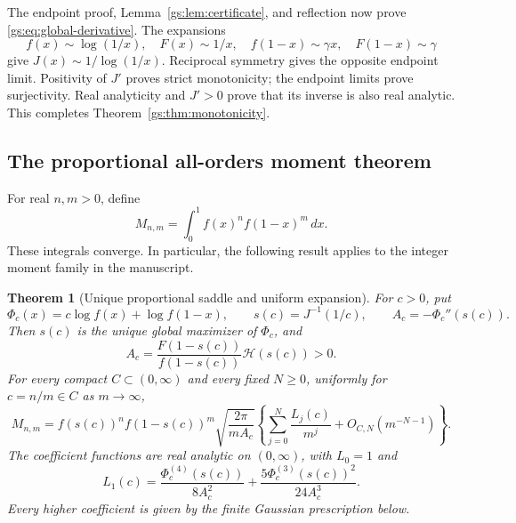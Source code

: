 \documentclass[11pt,a4paper]{article}
\numberwithin{equation}{section}
\theoremstyle{plain}
\newtheorem{theorem}{Theorem}[section]
\theoremstyle{definition}
\theoremstyle{remark}
\begin{document}
The endpoint proof, Lemma~\ref{gs:lem:certificate}, and reflection now
prove \eqref{gs:eq:global-derivative}. The expansions
\[
 f(x)\sim\log(1/x),\quad F(x)\sim1/x,\quad
 f(1-x)\sim\gamma x,\quad F(1-x)\sim\gamma
\]
give $J(x)\sim1/\log(1/x)$. Reciprocal symmetry gives the opposite
endpoint limit. Positivity of $J'$ proves strict monotonicity;
the endpoint limits prove surjectivity. Real analyticity and
$J'>0$ prove that its inverse is also real analytic.
This completes Theorem~\ref{gs:thm:monotonicity}.

\subsection{The proportional all-orders moment theorem}

For real $n,m>0$, define
\[
 M_{n,m}=\int_0^1 f(x)^n f(1-x)^m\,dx.
\]
These integrals converge. In particular, the following result applies
to the integer moment family in the manuscript.

\begin{theorem}[Unique proportional saddle and uniform expansion]
\label{gs:thm:proportional}
For $c>0$, put
\[
 \Phi_c(x)=c\log f(x)+\log f(1-x),\qquad
 s(c)=J^{-1}(1/c),\qquad
 A_c=-\Phi_c''(s(c)).
\]
Then $s(c)$ is the unique global maximizer of $\Phi_c$, and
\begin{equation}\label{gs:eq:curvature}
 A_c=\frac{F(1-s(c))}{f(1-s(c))}\mathcal H(s(c))>0.
\end{equation}
For every compact $C\subset(0,\infty)$ and every fixed $N\ge0$,
uniformly for $c=n/m\in C$ as $m\to\infty$,
\begin{equation}\label{gs:eq:laplace}
 M_{n,m}=f(s(c))^n f(1-s(c))^m
 \sqrt{\frac{2\pi}{mA_c}}
 \left\{\sum_{j=0}^N\frac{L_j(c)}{m^j}
                 +O_{C,N}(m^{-N-1})\right\}.
\end{equation}
The coefficient functions are real analytic on $(0,\infty)$, with
$L_0=1$ and
\begin{equation}\label{gs:eq:first-correction}
 L_1(c)=\frac{\Phi_c^{(4)}(s(c))}{8A_c^2}
       +\frac{5\Phi_c^{(3)}(s(c))^2}{24A_c^3}.
\end{equation}
Every higher coefficient is given by the finite Gaussian prescription
below.
\end{theorem}
\end{document}
